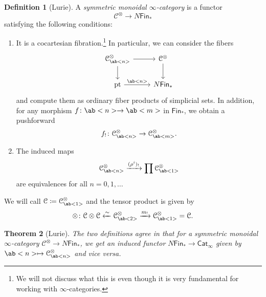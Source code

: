 \documentclass[10pt]{amsart}
\newtheorem{thm}{Theorem}[subsection]
\theoremstyle{definition}
\newtheorem{defn}[thm]{Definition}
\theoremstyle{remark}
\theoremstyle{plain}
\theoremstyle{definition}
\theoremstyle{remark}
\newcommand{\mc}[1]{\mathcal{#1}}
\newcommand{\mr}[1]{\mathrm{#1}}
\newcommand{\ms}[1]{\mathsf{#1}}
\newcommand{\1}{\mathbf{1}}
\newcommand{\2}{\mathbf{2}}
\newcommand{\3}{\mathbf{3}}
\newcommand{\pt}{\mr{pt}}
\begin{document}
\begin{defn}[Lurie]
    A \textit{symmetric monoidal $\infty$-category} is a functor 
    \[ \mc{C}^{\otimes} \to N\ms{Fin}_* \]
    satisfying the following conditions:
    \begin{enumerate}
        \item It is a cocartesian fibration.\footnote{We will not discuss what this is even though it is very fundamental for working with $\infty$-categories.} In particular, we can consider the fibers
        \begin{equation*}
        \begin{tikzcd}
            \mc{C}_{\ab<n>}^{\otimes} \ar{r} \ar{d} & \mc{C}^{\otimes} \ar{d} \\
            \pt \ar{r}{\ab<n>} & N\ms{Fin}_*
        \end{tikzcd}
        \end{equation*}
        and compute them as ordinary fiber products of simplicial sets. In addition, for any morphism $f \colon \ab<n> \to \ab<m>$ in $\ms{Fin}_*$, we obtain a pushforward
        \[ f_! \colon \mc{C}^{\otimes}_{\ab<n>} \to \mc{C}^{\otimes}_{\ab<m>}. \]
        \item The induced maps
        \[ \mc{C}^{\otimes}_{\ab<n>} \xrightarrow{(\rho^i)_!} \prod \mc{C}_{\ab<1>}^{\otimes} \]
        are equivalences for all $n = 0, 1, \ldots$
    \end{enumerate}
\end{defn}

We will call $\mc{C} \coloneqq \mc{C}_{\ab<1>}^{\otimes}$ and the tensor product is given by
\[ \otimes \colon \mc{C} \otimes \mc{C} \xleftarrow{\sim} \mc{C}_{\ab<2>}^{\otimes} \xrightarrow{m_!} \mc{C}_{\ab<1>}^{\otimes} = \mc{C}. \]

\begin{thm}[Lurie]
    The two definitions agree in that for a symmetric monoidal $\infty$-category $\mc{C}^{\otimes} \to N\ms{Fin}_*$, we get an induced functor $N\ms{Fin}_* \to \ms{Cat}_{\infty}$ given by $\ab<n> \mapsto \mc{C}_{\ab<n>}^{\otimes}$ and vice versa.
\end{thm}
\end{document}
